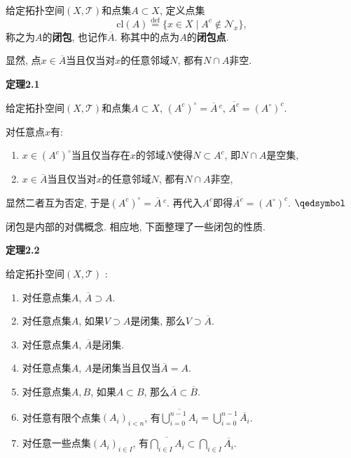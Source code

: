 \documentclass[UTF8]{ctexart}
\begin{document}
给定拓扑空间$(X,\mathcal{T})$和点集$A\subset X$, 定义点集
\[
    \mathrm{cl}(A)\overset{\mathrm{def}}{=}\{x\in X\mid
    A^c\notin\mathcal{N}_x\},
\]
称之为$A$的\textbf{闭包}, 也记作$\overline{A}$. 称其中的点为$A$的\textbf{闭包点}.

显然, 点$x\in \overline{A}$当且仅当对$x$的任意邻域$N$, 都有$N\cap A$非空.

\vspace{10pt}

\hypertarget{sec:定理2.1}{}
\noindent\textbf{定理2.1}

给定拓扑空间$(X,\mathcal{T})$和点集$A\subset X$,
$(A^c)^\circ=\overline{A}\,^c$, $\overline{A^c}=(A^\circ)^c$.


对任意点$x$有:
\begin{enumerate}
    \item $x\in(A^c)^\circ$当且仅当存在$x$的邻域$N$使得$N\subset A^c$,
    即$N\cap A$是空集,
    \item $x\in\overline{A}$当且仅当对$x$的任意邻域$N$, 都有$N\cap A$非空,
\end{enumerate}
显然二者互为否定, 于是$(A^c)^\circ=\overline{A}\,^c$.
再代入$A^c$即得$\overline{A^c}=(A^\circ)^c$. \hfill $\qedsymbol$

\vspace{10pt}

闭包是内部的对偶概念. 相应地, 下面整理了一些闭包的性质.

\vspace{10pt}

\hypertarget{sec:定理2.2}{}
\noindent\textbf{定理2.2}

给定拓扑空间$(X,\mathcal{T})$ :
\begin{enumerate}
    \item 对任意点集$A$, $\overline{A}\supset A$.
    \item 对任意点集$A$, 如果$V\supset A$是闭集, 那么$V\supset\overline{A}$.
    \item 对任意点集$A$, $\overline{A}$是闭集.
    \item 对任意点集$A$, $A$是闭集当且仅当$\overline{A}=A$.
    \item 对任意点集$A,B$, 如果$A\subset B$, 那么$\overline{A}\subset\overline{B}$.
    \vspace{3pt}
    \item 对任意有限个点集$(A_i)_{i<n}$, 有$\displaystyle
    \overline{\bigcup_{i=0}^{n-1}A_i}=\bigcup_{i=0}^{n-1}\overline{A_i}$.
    \vspace{3pt}
    \item 对任意一些点集$(A_i)_{i\in I}$, 有$\displaystyle
    \overline{\bigcap_{i\in I}A_i}\subset\bigcap_{i\in I}\overline{A_i}$.
\end{enumerate}
\end{document}
